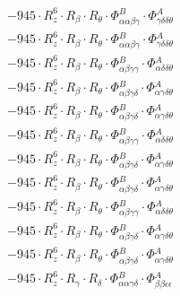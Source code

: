 \documentclass{article}
\begin{document}
\begin{subequations}
\begin{gather}
\begin{array}{c}
 \\[0.2em] 		 - 945 \cdot R_{z}^{6} \cdot R_{\beta{}} \cdot R_{\theta{}} \cdot \Phi{}^{B}_{\alpha{}\alpha{}\beta{}\gamma{}} \cdot \Phi{}^{A}_{\gamma{}\delta{}\delta{}\theta{}} 
 \\[0.2em] 		 - 945 \cdot R_{z}^{6} \cdot R_{\beta{}} \cdot R_{\theta{}} \cdot \Phi{}^{B}_{\alpha{}\alpha{}\beta{}\gamma{}} \cdot \Phi{}^{A}_{\gamma{}\delta{}\delta{}\theta{}} 
 \\[0.2em] 		 - 945 \cdot R_{z}^{6} \cdot R_{\beta{}} \cdot R_{\theta{}} \cdot \Phi{}^{B}_{\alpha{}\beta{}\gamma{}\gamma{}} \cdot \Phi{}^{A}_{\alpha{}\delta{}\delta{}\theta{}} 
 \\[0.2em] 		 - 945 \cdot R_{z}^{6} \cdot R_{\beta{}} \cdot R_{\theta{}} \cdot \Phi{}^{B}_{\alpha{}\beta{}\gamma{}\delta{}} \cdot \Phi{}^{A}_{\alpha{}\gamma{}\delta{}\theta{}} 
 \\[0.2em] 		 - 945 \cdot R_{z}^{6} \cdot R_{\beta{}} \cdot R_{\theta{}} \cdot \Phi{}^{B}_{\alpha{}\beta{}\gamma{}\delta{}} \cdot \Phi{}^{A}_{\alpha{}\gamma{}\delta{}\theta{}} 
 \\[0.2em] 		 - 945 \cdot R_{z}^{6} \cdot R_{\beta{}} \cdot R_{\theta{}} \cdot \Phi{}^{B}_{\alpha{}\beta{}\gamma{}\gamma{}} \cdot \Phi{}^{A}_{\alpha{}\delta{}\delta{}\theta{}} 
 \\[0.2em] 		 - 945 \cdot R_{z}^{6} \cdot R_{\beta{}} \cdot R_{\theta{}} \cdot \Phi{}^{B}_{\alpha{}\beta{}\gamma{}\delta{}} \cdot \Phi{}^{A}_{\alpha{}\gamma{}\delta{}\theta{}} 
 \\[0.2em] 		 - 945 \cdot R_{z}^{6} \cdot R_{\beta{}} \cdot R_{\theta{}} \cdot \Phi{}^{B}_{\alpha{}\beta{}\gamma{}\delta{}} \cdot \Phi{}^{A}_{\alpha{}\gamma{}\delta{}\theta{}} 
 \\[0.2em] 		 - 945 \cdot R_{z}^{6} \cdot R_{\beta{}} \cdot R_{\theta{}} \cdot \Phi{}^{B}_{\alpha{}\beta{}\gamma{}\gamma{}} \cdot \Phi{}^{A}_{\alpha{}\delta{}\delta{}\theta{}} 
 \\[0.2em] 		 - 945 \cdot R_{z}^{6} \cdot R_{\beta{}} \cdot R_{\theta{}} \cdot \Phi{}^{B}_{\alpha{}\beta{}\gamma{}\delta{}} \cdot \Phi{}^{A}_{\alpha{}\gamma{}\delta{}\theta{}} 
 \\[0.2em] 		 - 945 \cdot R_{z}^{6} \cdot R_{\beta{}} \cdot R_{\theta{}} \cdot \Phi{}^{B}_{\alpha{}\beta{}\gamma{}\delta{}} \cdot \Phi{}^{A}_{\alpha{}\gamma{}\delta{}\theta{}} 
 \\[0.2em] 		 - 945 \cdot R_{z}^{6} \cdot R_{\gamma{}} \cdot R_{\delta{}} \cdot \Phi{}^{B}_{\alpha{}\alpha{}\gamma{}\delta{}} \cdot \Phi{}^{A}_{\beta{}\beta{}\epsilon{}\epsilon{}} 

\end{array}
\end{gather}
\end{subequations}
\end{document}
